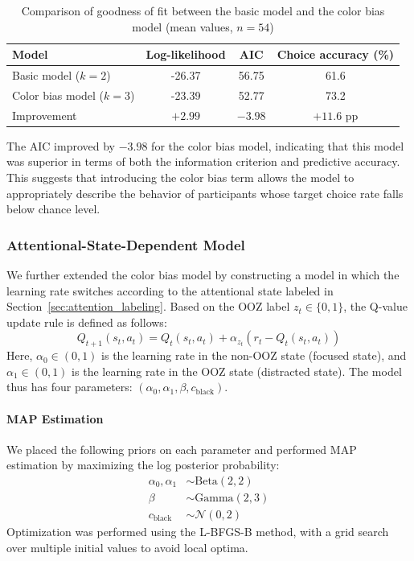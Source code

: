 \documentclass[dvipdfmx]{article}
\begin{document}
\begin{table}[h]
    \centering
    \caption{Comparison of goodness of fit between the basic model and the color bias model (mean values, $n=54$)}
    \label{tab:model_comparison}
    \begin{tabular}{lS[table-format=-2.2]S[table-format=2.2]S[table-format=2.1]}
        \toprule
        Model & {Log-likelihood} & {AIC} & {Choice accuracy (\%)} \\
        \midrule
        Basic model ($k=2$)      & -26.37 & 56.75 & 61.6 \\
        Color bias model ($k=3$) & -23.39 & 52.77 & 73.2 \\
        \midrule
        Improvement & {$+2.99$} & {$-3.98$} & {$+11.6$ pp} \\
        \bottomrule
    \end{tabular}
\end{table}

The AIC improved by $-3.98$ for the color bias model, indicating that this model was superior in terms of both the information criterion and predictive accuracy.
This suggests that introducing the color bias term allows the model to appropriately describe the behavior of participants whose target choice rate falls below chance level.


\subsubsection{Attentional-State-Dependent Model}

We further extended the color bias model by constructing a model in which the learning rate switches according to the attentional state labeled in Section~\ref{sec:attention_labeling}.
Based on the OOZ label $z_t \in \{0, 1\}$, the Q-value update rule is defined as follows:
\begin{equation}
    Q_{t+1}(s_t, a_t) = Q_t(s_t, a_t) + \alpha_{z_t} \left( r_t - Q_t(s_t, a_t) \right)
\end{equation}
Here, $\alpha_0 \in (0,1)$ is the learning rate in the non-OOZ state (focused state), and $\alpha_1 \in (0,1)$ is the learning rate in the OOZ state (distracted state).
The model thus has four parameters: $(\alpha_0, \alpha_1, \beta, c_\mathrm{black})$.

\paragraph{MAP Estimation}
We placed the following priors on each parameter and performed MAP estimation by maximizing the log posterior probability:
\begin{align}
    \alpha_0, \alpha_1 &\sim \mathrm{Beta}(2, 2) \\
    \beta               &\sim \mathrm{Gamma}(2, 3) \\
    c_\mathrm{black}    &\sim \mathcal{N}(0, 2)
\end{align}
Optimization was performed using the L-BFGS-B method, with a grid search over multiple initial values to avoid local optima.
\end{document}
